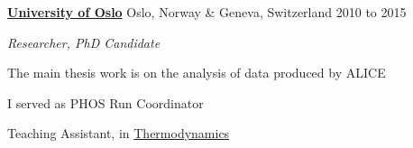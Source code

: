 \documentclass[11pt]{article}
\newenvironment{outerlist}[1][\enskip\textbullet]%
        {\begin{itemize}[#1]}{\end{itemize}%
         \vspace{-.6\baselineskip}}
\newenvironment{innerlist}[1][\enskip\textbullet]%
        {\begin{compactitem}[#1]}{\end{compactitem}}
\newcommand{\blankline}{\quad\pagebreak[2]}
\begin{document}
\href{http://www.uib.no/en}{\textbf{University of Oslo}}
Oslo, Norway \& Geneva, Switzerland
\hfill 2010 to 2015
\begin{outerlist}
\item[] \textit{Researcher, PhD Candidate}
  \begin{innerlist}
    \footnotesize
  \item The main thesis work is on the analysis of data produced by ALICE
  \item I served as PHOS Run Coordinator
  \item Teaching Assistant, in \href{http://www.uio.no/studier/emner/matnat/fys/FYS2160/index-eng.html}{Thermodynamics}
  \end{innerlist}
\end{outerlist}

\blankline
\end{document}
